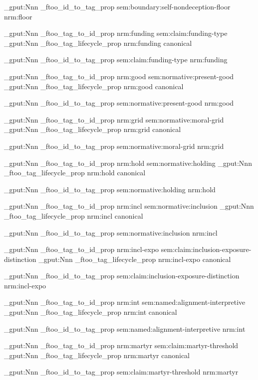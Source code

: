 \prop_gput:Nnn \g_ftoo_id_to_tag_prop { sem:boundary:self-nondeception-floor } { nrm:floor }


\prop_gput:Nnn \g_ftoo_tag_to_id_prop { nrm:funding } { sem:claim:funding-type }
\prop_gput:Nnn \g_ftoo_tag_lifecycle_prop { nrm:funding } { canonical }

\prop_gput:Nnn \g_ftoo_id_to_tag_prop { sem:claim:funding-type } { nrm:funding }


\prop_gput:Nnn \g_ftoo_tag_to_id_prop { nrm:good } { sem:normative:present-good }
\prop_gput:Nnn \g_ftoo_tag_lifecycle_prop { nrm:good } { canonical }

\prop_gput:Nnn \g_ftoo_id_to_tag_prop { sem:normative:present-good } { nrm:good }


\prop_gput:Nnn \g_ftoo_tag_to_id_prop { nrm:grid } { sem:normative:moral-grid }
\prop_gput:Nnn \g_ftoo_tag_lifecycle_prop { nrm:grid } { canonical }

\prop_gput:Nnn \g_ftoo_id_to_tag_prop { sem:normative:moral-grid } { nrm:grid }


\prop_gput:Nnn \g_ftoo_tag_to_id_prop { nrm:hold } { sem:normative:holding }
\prop_gput:Nnn \g_ftoo_tag_lifecycle_prop { nrm:hold } { canonical }

\prop_gput:Nnn \g_ftoo_id_to_tag_prop { sem:normative:holding } { nrm:hold }


\prop_gput:Nnn \g_ftoo_tag_to_id_prop { nrm:incl } { sem:normative:inclusion }
\prop_gput:Nnn \g_ftoo_tag_lifecycle_prop { nrm:incl } { canonical }

\prop_gput:Nnn \g_ftoo_id_to_tag_prop { sem:normative:inclusion } { nrm:incl }


\prop_gput:Nnn \g_ftoo_tag_to_id_prop { nrm:incl-expo } { sem:claim:inclusion-exposure-distinction }
\prop_gput:Nnn \g_ftoo_tag_lifecycle_prop { nrm:incl-expo } { canonical }

\prop_gput:Nnn \g_ftoo_id_to_tag_prop { sem:claim:inclusion-exposure-distinction } { nrm:incl-expo }


\prop_gput:Nnn \g_ftoo_tag_to_id_prop { nrm:int } { sem:named:alignment-interpretive }
\prop_gput:Nnn \g_ftoo_tag_lifecycle_prop { nrm:int } { canonical }

\prop_gput:Nnn \g_ftoo_id_to_tag_prop { sem:named:alignment-interpretive } { nrm:int }


\prop_gput:Nnn \g_ftoo_tag_to_id_prop { nrm:martyr } { sem:claim:martyr-threshold }
\prop_gput:Nnn \g_ftoo_tag_lifecycle_prop { nrm:martyr } { canonical }

\prop_gput:Nnn \g_ftoo_id_to_tag_prop { sem:claim:martyr-threshold } { nrm:martyr }


